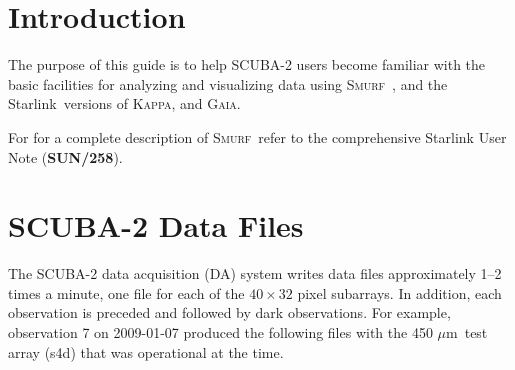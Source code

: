 \documentclass[twoside,11pt]{article}
\newcommand{\micron}{\mbox{\,${\mu}$m}}            %
\newcommand{\stardocinitials}  {SC}
\newcommand{\stardocnumber}    {19.01}
\newcommand{\stardocabstract}  {[Text of abstract]}
\newcommand{\starlink}{\htmladdnormallink{Starlink}{http://star-www.rl.ac.uk/}}
\newcommand{\Kappa}{\xref{\textsc{Kappa}}{sun95}{}}
\newcommand{\gaia}{\xref{\textsc{Gaia}}{sun214}{}}
\newcommand{\smurf}{\xref{\textsc{Smurf}}{sun258}{}}
\newcommand{\stardocname}{\stardocinitials /\stardocnumber}
\newcommand{\htmladdnormallink}[2]{#1}
\newenvironment{latexonly}{}{}
\newcommand{\xref}[3]{#1}
\newcommand{\xlabel}[1]{}
\renewcommand{\_}{\texttt{\symbol{95}}}
\renewcommand{\thepage}{\roman{page}}
\begin{document}
\begin{htmlonly}
\end{htmlonly}





  \newpage
  \begin{latexonly}
    \setlength{\parskip}{0mm}
    \tableofcontents
    \setlength{\parskip}{\medskipamount}
    \markboth{\stardocname}{\stardocname}
  \end{latexonly}


\cleardoublepage
\renewcommand{\thepage}{\arabic{page}}
\setcounter{page}{1}


\section{\xlabel{introduction}Introduction}

The purpose of this guide is to help SCUBA-2 users become familiar
with the basic facilities for analyzing and visualizing data using
\smurf\ \cite{smurf}, and the \starlink\ versions of \Kappa \cite{kappa},
and \gaia \cite{gaia}.

For for a complete description of \smurf\ refer to the comprehensive
Starlink User Note (\xref{\textbf{SUN/258}}{sun258}{}).


\section{\xlabel{data_files}SCUBA-2 Data Files}

The SCUBA-2 data acquisition (DA) system writes data files
approximately 1--2 times a minute, one file for each of the
$40\times32$ pixel subarrays. In addition, each observation is
preceded and followed by dark observations. For example, observation 7
on 2009-01-07 produced the following files with the 450\,\micron\ test
array (s4d) that was operational at the time.
\end{document}
